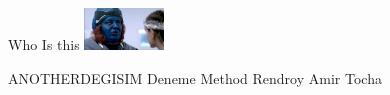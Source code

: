 \documentclass{exam}
\begin{document}
\begin{questions}
\question Who Is this\newline
\includegraphics[height=3em]{rendroy2.jpg} \newline
\begin{oneparchoices}
\choice ANOTHERDEGISIM
\choice Deneme Method
\choice Rendroy
\choice Amir Tocha
\end{oneparchoices}
\end{questions}
\end{document}
